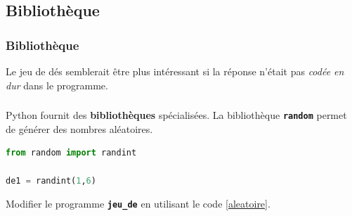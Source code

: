 \documentclass[svgnames,11pt]{beamer}
\begin{document}
\subsection{Bibliothèque}
\begin{frame}
    \frametitle{Bibliothèque}

    Le jeu de dés semblerait être plus intéressant si la réponse n'était pas \emph{codée en dur} dans le programme.

\end{frame}
\begin{frame}[fragile]
    \frametitle{}
Python fournit des \textbf{bibliothèques} spécialisées. La bibliothèque \textbf{\texttt{random}} permet de générer des nombres aléatoires.
\begin{center}
\begin{lstlisting}[language=Python , basicstyle=\ttfamily\small, xleftmargin=2em, xrightmargin=2em]
from random import randint

de1 = randint(1,6)
\end{lstlisting}
\label{aleatoire}
\end{center}
\begin{activite}
Modifier le programme \textbf{\texttt{jeu\_de}} en utilisant le code \ref{aleatoire}.
\end{activite}
\end{frame}
\end{document}
